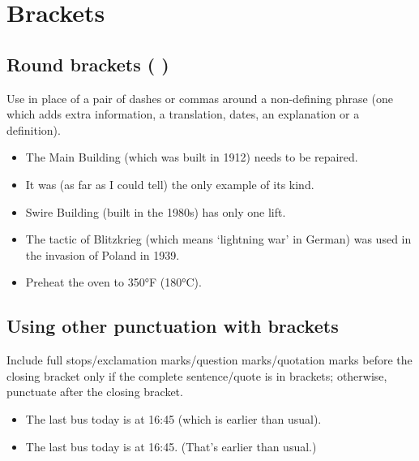 \documentclass[11pt,a4paper]{book}
\newcommand{\cmark}{{\color{green(html/cssgreen)}\checkmark}}%
\begin{document}
			\section{Brackets}
			\subsection{Round brackets ( )}
			Use in place of a pair of dashes or commas around a non-defining phrase (one which adds extra information, a translation, dates, an explanation or a definition).
			{\firasans \begin{mdframed}[backgroundcolor=aliceblue] \begin{itemize}[label=\cmark]
				\item The Main Building (which was built in 1912) needs to be repaired.
				\item It was (as far as I could tell) the only example of its kind.
				\item Swire Building (built in the 1980s) has only one lift.
				\item The tactic of Blitzkrieg (which means `lightning war' in German) was used in the invasion of Poland in 1939.
				\item Preheat the oven to 350°F (180°C).
			\end{itemize} \end{mdframed} }
			\subsection{Using other punctuation with brackets}
			Include full stops/exclamation marks/question marks/quotation marks before the closing bracket only if the complete sentence/quote is in brackets; otherwise, punctuate after the closing bracket.
			{\firasans \begin{mdframed}[backgroundcolor=aliceblue] \begin{itemize}[label=\cmark]
				\item The last bus today is at 16:45 (which is earlier than usual).
				\item The last bus today is at 16:45. (That's earlier than usual.)
			\end{itemize} \end{mdframed} }
\end{document}
